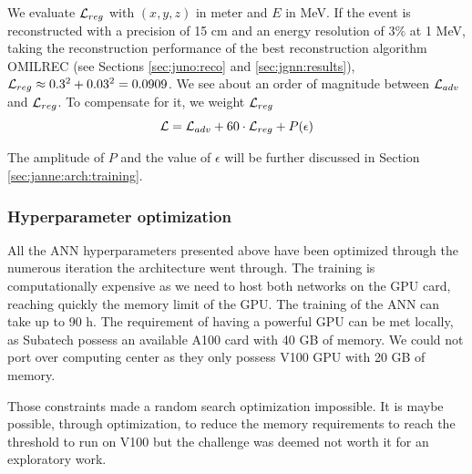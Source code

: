 \documentclass[../main.tex]{subfiles}
\begin{document}
We evaluate ${\cal L}_{reg}$ with $(x, y, z)$ in meter and $E$ in MeV. If the event is reconstructed with a precision of 15 cm and an energy resolution of 3\% at 1 MeV, taking the reconstruction performance of the best reconstruction algorithm OMILREC (see Sections \ref{sec:juno:reco} and \ref{sec:jgnn:results}), ${\cal L}_{reg} \approx 0.3^2 + 0.03^2 = 0.0909$. We see about an order of magnitude between ${\cal L}_{adv}$ and ${\cal L}_{reg}$. To compensate for it, we weight ${\cal L}_{reg}$
\begin{equation}
  {\cal L} = {\cal L}_{adv} + 60\cdot{\cal L}_{reg} + P(\epsilon)
\end{equation}

The amplitude of $P$ and the value of $\epsilon$ will be further discussed in Section \ref{sec:janne:arch:training}.

\subsubsection{Hyperparameter optimization}

All the ANN hyperparameters presented above have been optimized through the numerous iteration the architecture went through. The training is computationally expensive as we need to host both networks on the GPU card, reaching quickly the memory limit of the GPU. The training of the ANN can take up to 90 h. The requirement of having a powerful GPU can be met locally, as Subatech possess an available A100 \cite{noauthor_nvidia_nodate-1} card with 40 GB of memory. We could not port over computing center as they only possess V100 \cite{noauthor_nvidia_nodate-2} GPU with 20 GB of memory.

Those constraints made a random search optimization impossible. It is maybe possible, through optimization, to reduce the memory requirements to reach the threshold to run on V100 but the challenge was deemed not worth it for an exploratory work.
\end{document}
